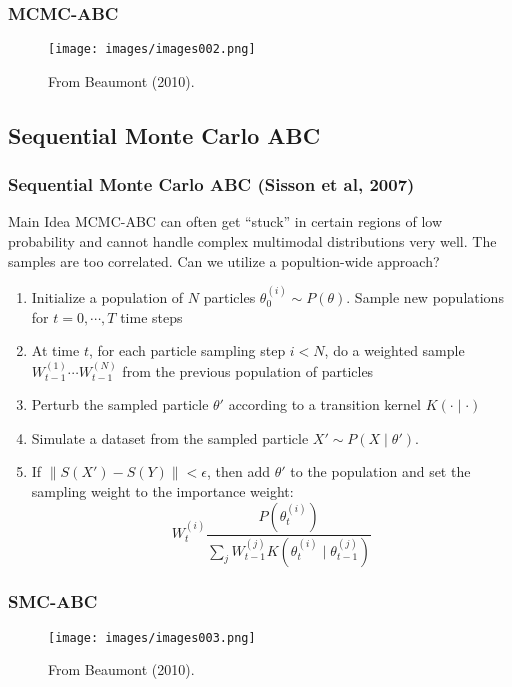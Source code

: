 \documentclass{beamer}
\begin{document}

\begin{frame}
\frametitle{MCMC-ABC}
\begin{figure}
\texttt{[image: images/images002.png]}
\caption{From Beaumont (2010).}
\end{figure}
\end{frame}


\subsection{Sequential Monte Carlo ABC}
\begin{frame}
\frametitle{Sequential Monte Carlo ABC (Sisson et al, 2007)}
\begin{block}{Main Idea}
MCMC-ABC can often get ``stuck'' in certain regions of low probability and cannot handle complex multimodal distributions very well. The samples are too correlated. Can we utilize a popultion-wide approach?
\end{block}
\pause
\begin{enumerate}
\item Initialize a population of $N$ particles $\theta_0^{(i)} \sim P(\theta)$. Sample new populations for $t = 0, \cdots, T$ time steps
\item At time $t$, for each particle sampling step $i < N$, do a weighted sample $W_{t-1}^{(1)} \cdots W_{t-1}^{(N)}$ from the previous population of particles
\item Perturb the sampled particle $\theta'$ according to a transition kernel $K(\cdot \mid \cdot)$
\item Simulate a dataset from the sampled particle $X' \sim P(X \mid \theta')$.
\item If $\|S(X') - S(Y)\| < \epsilon$, then add $\theta'$ to the population and set the sampling weight to the importance weight:
$$W_t^{(i)} \frac{P(\theta_t^{(i)})}{\sum_j W_{t-1}^{(j)}K(\theta_{t}^{(i)} \mid \theta_{t-1}^{(j)})}$$
\end{enumerate}
\end{frame}


\begin{frame}
\frametitle{SMC-ABC}
\begin{figure}
\texttt{[image: images/images003.png]}
\caption{From Beaumont (2010).}
\end{figure}
\end{frame}
\end{document}
